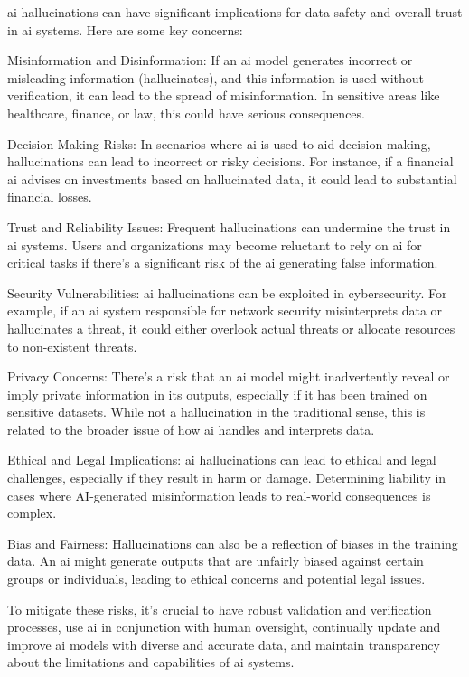 \begin{aibox}%
  \Gls{ai} hallucinations can have significant implications for data safety and overall trust in \gls{ai} systems. Here are some key concerns:

Misinformation and Disinformation: If an \gls{ai} model generates incorrect or misleading \gls{information} (hallucinates), and this \gls{information} is used without verification, it can lead to the spread of misinformation. In sensitive areas like healthcare, finance, or law, this could have serious consequences.

Decision-Making Risks: In scenarios where \gls{ai} is used to aid decision-making, hallucinations can lead to incorrect or risky decisions. For instance, if a financial \gls{ai} advises on investments based on hallucinated data, it could lead to substantial financial losses.

Trust and Reliability Issues: Frequent hallucinations can undermine the trust in \gls{ai} systems. Users and organizations may become reluctant to rely on \gls{ai} for critical tasks if there's a significant risk of the \gls{ai} generating false \gls{information}.

Security Vulnerabilities: \gls{ai} hallucinations can be exploited in cybersecurity. For example, if an \gls{ai} system responsible for network security misinterprets data or hallucinates a threat, it could either overlook actual threats or allocate resources to non-existent threats.

Privacy Concerns: There’s a risk that an \gls{ai} model might inadvertently reveal or imply private \gls{information} in its outputs, especially if it has been trained on sensitive datasets. While not a hallucination in the traditional sense, this is related to the broader issue of how \gls{ai} handles and interprets data.

Ethical and Legal Implications: \gls{ai} hallucinations can lead to ethical and legal challenges, especially if they result in harm or damage. Determining liability in cases where AI-generated misinformation leads to real-world consequences is complex.

Bias and Fairness: Hallucinations can also be a reflection of biases in the training data. An \gls{ai} might generate outputs that are unfairly biased against certain groups or individuals, leading to ethical concerns and potential legal issues.

To mitigate these risks, it's crucial to have robust validation and verification processes, use \gls{ai} in conjunction with human oversight, continually update and improve \gls{ai} models with diverse and accurate data, and maintain transparency about the limitations and capabilities of \gls{ai} systems.
\end{aibox}

